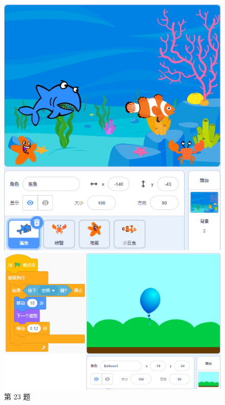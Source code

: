 \documentclass[10pt, a4paper]{article}
\begin{document}
\begin{enumerate}
        \begin{figure}[htbp]
            \centering
            \begin{minipage}[t]{.25\textwidth}
                \centering
                \includegraphics[width=\textwidth]{23.png}
                \caption*{第 23 题}
            \end{minipage}
            \begin{minipage}[t]{.4\textwidth}
                \centering
                \includegraphics[width=\textwidth]{24.png}

\end{minipage}
\end{figure}
\end{enumerate}
\end{document}
